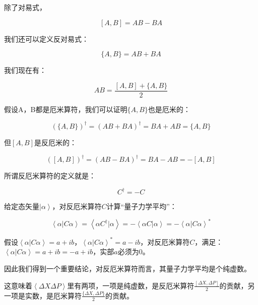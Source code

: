 除了对易式，

\begin{equation}
\left[ A, B \right] = AB - BA
\end{equation}

我们还可以定义反对易式：

\begin{equation}
\{ A, B \} = AB + BA
\end{equation}

我们现在有：

\begin{equation}
AB = \frac{\left[ A, B \right] + \{ A, B \} }{2}
\end{equation}

假设A，B都是厄米算符，我们可以证明$\{ A, B \}$也是厄米的：

\begin{equation*}
\left( \{ A, B \} \right)^\dagger = \left( AB + BA \right)^\dagger = BA + AB = \{ A, B \}
\end{equation*}

但$\left[ A, B \right]$是反厄米的：

\begin{equation*}
\left( \left[ A, B \right] \right)^\dagger = \left( AB - BA \right)^\dagger = BA - AB = -  \left[ A, B \right]
\end{equation*}

所谓反厄米算符的定义就是：

\begin{equation}
C^\dagger = -C
\end{equation}

给定态矢量$\left| \alpha \right\rangle$，对反厄米算符$C$计算“量子力学平均”：

\begin{equation*}
\left\langle \alpha | C \alpha \right\rangle = \left\langle \alpha C^\dagger |  \alpha \right\rangle = - \left\langle \alpha C |  \alpha \right\rangle = - \left\langle \alpha | C \alpha \right\rangle^* 
\end{equation*}

假设$\left\langle \alpha | C \alpha \right\rangle = a + i b$，$\left\langle \alpha | C \alpha \right\rangle^* = a - i b$，对反厄米算符$C$，满足：$\left\langle \alpha | C \alpha \right\rangle = a + ib = -a + ib$，实部$a$必须为0。

因此我们得到一个重要结论，对反厄米算符而言，其量子力学平均是个纯虚数。

这意味着$\left\langle \Delta X \Delta P \right\rangle$里有两项，一项是纯虚数，是反厄米算符$\frac{\left[ \Delta X, \Delta P \right]}{2}$的贡献，另一项是实数，是厄米算符$\frac{\{ \Delta X, \Delta P \}}{2}$的贡献。

